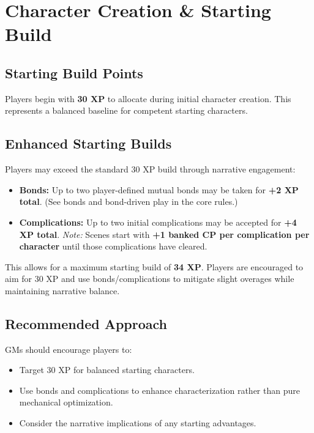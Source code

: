 

\section{Character Creation \& Starting Build}

\subsection{Starting Build Points}
Players begin with \textbf{30 XP} to allocate during initial character creation. This represents a balanced baseline for competent starting characters.

\subsection{Enhanced Starting Builds}
Players may exceed the standard 30 XP build through narrative engagement:
\begin{itemize}
  \item \textbf{Bonds:} Up to two player-defined mutual bonds may be taken for \textbf{+2 XP total}. (See bonds and bond-driven play in the core rules.)
  \item \textbf{Complications:} Up to two initial complications may be accepted for \textbf{+4 XP total}. \emph{Note:} Scenes start with \textbf{+1 banked CP per complication per character} until those complications have cleared.
\end{itemize}
This allows for a maximum starting build of \textbf{34 XP}. Players are encouraged to aim for 30 XP and use bonds/complications to mitigate slight overages while maintaining narrative balance.

\subsection{Recommended Approach}
GMs should encourage players to:
\begin{itemize}
  \item Target 30 XP for balanced starting characters.
  \item Use bonds and complications to enhance characterization rather than pure mechanical optimization.
  \item Consider the narrative implications of any starting advantages.
\end{itemize}

